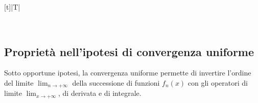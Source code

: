 \documentclass[letterpaper,10pt,italian]{jupyterBook}
\begin{document}
\begin{savenotes}\sphinxattablestart
\centering
\begin{tabulary}{\linewidth}[t]{|T|}
\hline

\sphinxAtStartPar
{}
\\
\hline
\end{tabulary}
\par
\sphinxattableend\end{savenotes}


\subsection{Proprietà nell’ipotesi di convergenza uniforme}
\label{\detokenize{ch/series/series-functions-real:proprieta-nell-ipotesi-di-convergenza-uniforme}}
\sphinxAtStartPar
Sotto opportune ipotesi, la convergenza uniforme permette di invertire l’ordine del limite \(\lim_{n\rightarrow+\infty}\) della successione di funzioni \(f_n(x)\) con gli operatori di limite \(\lim_{x \rightarrow + \infty}\), di derivata e di integrale.
\end{document}
